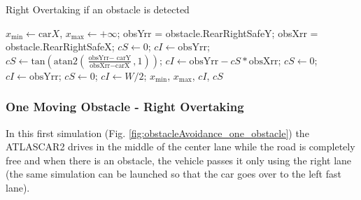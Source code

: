 \documentclass[conference,11pt]{IEEEtran}
\begin{document}
\begin{algorithm}%
\caption{Right Overtaking if an obstacle is detected}
\small
\begin{algorithmic}[1]
  \State $x_\text{min} \gets \text{car}X $,  $x_\text{max} \gets +\infty$;
  \State obsYrr = obstacle.RearRightSafeY;
  \State obsXrr = obstacle.RearRightSafeX;
        \State $cS \gets 0$; $cI \gets \text{obsYrr}$;
        \Else
        \State $cS \gets \text{tan}(\text{atan2}(\frac{\text{obsYrr}-\text{ carY}}{\text{obsXrr}-\text{carX}},1))$;
        \State $cI \gets \text{obsYrr}-cS*\text{obsXrr}$;
        \EndIf
    \Else
    \State $cS \gets 0$; $cI \gets \text{obsYrr}$;
    \Else
        \State $cS \gets 0$; $cI \gets W/2$;
    \EndIf
    \EndIf
  \State \Return $x_\text{min}$, $x_\text{max}$, $cI$, $cS$
\EndFunction
\end{algorithmic}
\label{alg:rightOvertaking}
\end{algorithm}
%
%




\subsubsection{One Moving Obstacle - Right Overtaking}
In this first simulation
(Fig. \ref{fig:obstacleAvoidance_one_obstacle}) the ATLASCAR2 drives in the middle of the center lane while the road is completely free and when there is an obstacle, the vehicle passes it only using the right lane (the same simulation can be launched so that the car goes over to the left fast lane). 
\end{document}
